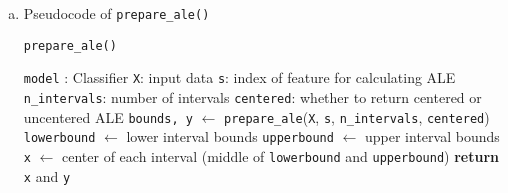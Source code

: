 {\begin{enumerate}[a)]
%

\item Pseudocode of  \texttt{prepare\_ale()}

\begin{algorithm}[h]
\caption{\texttt{prepare\_ale()}}
\begin{algorithmic}[1]
\Require \texttt{model} : Classifier 
\Require \texttt{X}: input data 
\Require \texttt{s}: index of feature for calculating ALE
\Require \texttt{n\_intervals}: number of intervals 
\Require \texttt{centered}: whether to return centered or uncentered ALE
\State \texttt{bounds, y} $\gets$ \texttt{prepare\_ale}(\texttt{X}, \texttt{s}, \texttt{n\_intervals}, \texttt{centered})
\State \texttt{lowerbound} $\gets$ lower interval bounds
\State \texttt{upperbound} $\gets$ upper interval bounds
\State \texttt{x} $\gets$ center of each interval (middle of \texttt{lowerbound} and \texttt{upperbound})
\State \textbf{return}  \texttt{x} and \texttt{y}
\end{algorithmic}
\end{algorithm}

%

%


\end{enumerate}
}